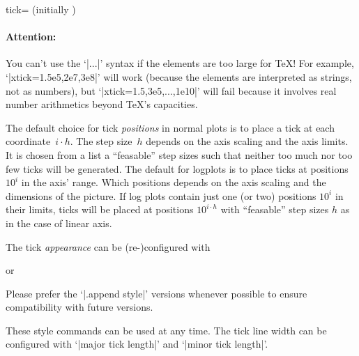 \begin{pgfplotsxykey}{\x tick= (initially \marg{})}
\paragraph{Attention:} You can't use the `|...|' syntax if the elements are too large for \TeX! For example, `|xtick=1.5e5,2e7,3e8|' will work (because the elements are interpreted as strings, not as numbers), but `|xtick=1.5,3e5,...,1e10|' will fail because it involves real number arithmetics beyond \TeX's capacities.
\vspace*{0.3cm}

\noindent
The default choice for tick \emph{positions} in normal plots is to place a tick at each coordinate~$i\cdot h$. The step size~$h$ depends on the axis scaling and the axis limits. It is chosen from a list a ``feasable'' step sizes such that neither too much nor too few ticks will be generated. The default for logplots is to place ticks at positions $10^i$ in the axis' range. Which positions depends on the axis scaling and the dimensions of the picture. If log plots contain just one (or two) positions $10^i$ in their limits, ticks will be placed at positions $10^{i\cdot h}$ with ``feasable'' step sizes $h$ as in the case of linear axis.


\noindent
The tick \emph{appearance} can be (re-)configured with
\begin{codeexample}
\end{codeexample}
or
\begin{codeexample}
\end{codeexample}
Please prefer the `|.append style|' versions whenever possible to ensure compatibility with future versions.

These style commands can be used at any time. The tick line width can be configured with `|major tick length|' and `|minor tick length|'.

\begin{codeexample}[]
\end{codeexample}


\end{pgfplotsxykey}
